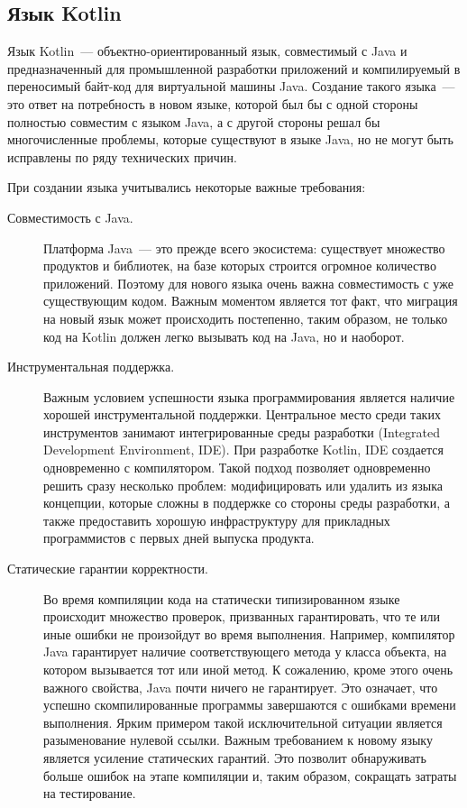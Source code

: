 \subsection{Язык Kotlin}
Язык Kotlin~--- объектно-ориентированный язык, совместимый с Java и предназначенный для промышленной разработки приложений и компилируемый в переносимый байт-код для виртуальной машины Java. Создание такого языка~--- это ответ на потребность в новом языке, которой был бы с одной стороны полностью совместим с языком Java, а с другой стороны решал бы многочисленные проблемы, которые существуют в языке Java, но не могут быть исправлены по ряду технических причин.

При создании языка учитывались некоторые важные требования: %
\begin{description}
	\item[Совместимость с Java.] Платформа Java~--- это прежде всего экосистема: существует множество продуктов и библиотек, на базе которых строится огромное количество приложений. 
	Поэтому для нового языка очень важна совместимость с уже существующим кодом. Важным моментом является тот факт, что миграция на новый язык может происходить постепенно, таким образом, не только код на Kotlin должен легко вызывать код на Java, но и наоборот.

	\item[Инструментальная поддержка.] Важным условием успешности языка программирования является наличие хорошей инструментальной поддержки. Центральное место среди таких инструментов занимают интегрированные среды разработки (Integrated Development Environment, IDE). 
	При разработке Kotlin, IDE создается одновременно с компилятором. Такой подход позволяет одновременно решить сразу несколько проблем: модифицировать или удалить из языка концепции, которые сложны в поддержке со стороны среды разработки, а также предоставить хорошую инфраструктуру для прикладных программистов с первых дней выпуска продукта.

	\item[Статические гарантии корректности.] Во время компиляции кода на статически типизированном языке происходит множество проверок, призванных гарантировать, что те или иные ошибки не произойдут во время выполнения. Например, компилятор Java гарантирует наличие соответствующего метода у класса объекта, на котором вызывается тот или иной метод. К сожалению, кроме этого очень важного свойства, Java почти ничего не гарантирует. Это означает, что успешно скомпилированные программы завершаются с ошибками времени выполнения. Ярким примером такой исключительной ситуации является разыменование нулевой ссылки. Важным требованием к новому языку является усиление статических гарантий. Это позволит обнаруживать больше ошибок на этапе компиляции и, таким образом, сокращать затраты на тестирование.


\end{description}
